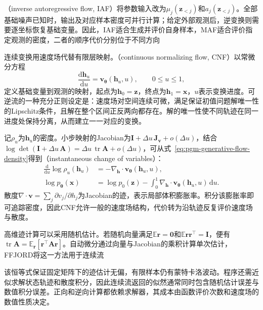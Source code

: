 （inverse autoregressive flow, IAF）将参数输入改为$\mu_j(\bm{z}_{<j})$和$a_j(\bm{z}_{<j})$。全部基础噪声已知时，输出及对应样本密度可并行计算；给定外部观测后，逆变换则需要逐坐标恢复基础变量。因此，IAF适合生成并评价自身样本，MAF适合评价指定观测的密度，二者的顺序代价分别位于不同方向

连续变换用速度场代替有限层映射。（continuous normalizing flow, CNF）以常微分方程
\[
  \frac{\mathrm{d}\bm{h}_u}{\mathrm{d}u}
    =\bm{v}_{\bm{\theta}}(\bm{h}_u,u),
  \qquad 0\leq u\leq1,
\]
定义基础变量到观测的映射，起点为$\bm{h}_0=\bm{z}$，终点为$\bm{h}_1=\bm{x}$，$u$表示变换进度。可逆流的一种充分正则设定是：速度场对空间连续可微，满足保证初值问题解唯一性的Lipschitz条件，且解在整个区间正反两向都存在。解的唯一性使不同轨迹在同一进度处保持分离，从而建立一一对应的变换。

记$\rho_u$为$\bm{h}_u$的密度。小步映射的Jacobian为$\bm{I}+\Delta u\,\bm{J}_{\bm{v}}+o(\Delta u)$，结合$\log\det(\bm{I}+\Delta u\,\bm{A})=\Delta u\,\operatorname{tr}\bm{A}+o(\Delta u)$，可从式~\eqref{eq:pgm-generative-flow-density}得到（instantaneous change of variables）：
\begin{equation}
  \label{eq:pgm-generative-instantaneous-change}
  \begin{aligned}
    \frac{\mathrm{d}}{\mathrm{d}u}
         \log\rho_u(\bm{h}_u)
       &=-\nabla_{\bm{h}}\!\cdot
          \bm{v}_{\bm{\theta}}(\bm{h}_u,u),\\
    \log p_{\bm{\theta}}(\bm{x})
       &=\log p_0(\bm{z})
         -\int_0^1\nabla_{\bm{h}}\!\cdot
           \bm{v}_{\bm{\theta}}(\bm{h}_u,u)\,\mathrm{d}u.
  \end{aligned}
\end{equation}
散度$\nabla\cdot\bm{v}=\sum_j\partial v_j/\partial h_j$为Jacobian的迹，表示局部体积膨胀率。积分该膨胀率即可追踪密度，因此CNF允许一般的速度场结构，代价转为沿轨迹反复评价速度场与散度。

高维迹计算可以采用随机估计。若随机向量满足$\mathbb{E}\bm{r}=\bm{0}$和$\mathbb{E}\bm{r}\bm{r}^{\top}=\bm{I}$，便有$\operatorname{tr}\bm{A}=\mathbb{E}_{\bm{r}}[\bm{r}^{\top}\bm{A}\bm{r}]$。自动微分通过向量与Jacobian的乘积计算单次估计，FFJORD将这一方法用于连续流

该恒等式保证固定矩阵下的迹估计无偏，有限样本仍有蒙特卡洛波动。程序还需近似求解状态轨迹和散度积分，因此连续流返回的似然通常同时包含随机估计误差与数值积分误差。正向和逆向计算都依赖求解器，其成本由函数评价次数和速度场的数值性质决定。

